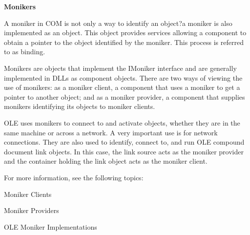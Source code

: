 \textbf{Monikers}

A moniker in COM is not only a way to identify an object?a moniker is also implemented as an object. This object provides services allowing a component to obtain a pointer to the object identified by the moniker. This process is referred to as binding.

Monikers are objects that implement the IMoniker interface and are generally implemented in DLLs as component objects. There are two ways of viewing the use of monikers: as a moniker client, a component that uses a moniker to get a pointer to another object; and as a moniker provider, a component that supplies monikers identifying its objects to moniker clients.

OLE uses monikers to connect to and activate objects, whether they are in the same machine or across a network. A very important use is for network connections. They are also used to identify, connect to, and run OLE compound document link objects. In this case, the link source acts as the moniker provider and the container holding the link object acts as the moniker client.

For more information, see the following topics:
\begin{list}{label}{spacing}
	\item Moniker Clients
	\item Moniker Providers
	\item OLE Moniker Implementations
\end{list}